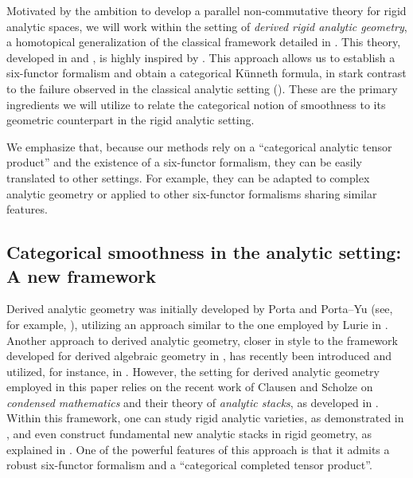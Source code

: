 \documentclass[oneside, hidelinks, 12pt, a4paper,reqno]{amsart}
\theoremstyle{plain}
\theoremstyle{definition}
\theoremstyle{plain}
\begin{document}
Motivated by the ambition to develop a parallel non-commutative theory for rigid analytic spaces, we will work within the setting of \emph{derived rigid analytic geometry}, a homotopical generalization of the classical framework detailed in \cite{bosch2014lectures}. This theory, developed in  and , is highly inspired by \cite{mikami2023fppfdescentcondensedanimatedrings}. This approach allows us to establish a six-functor formalism and obtain a categorical K\"unneth formula, in stark contrast to the failure observed in the classical analytic setting (). These are the primary ingredients we will utilize to relate the categorical notion of smoothness to its geometric counterpart in the rigid analytic setting.

We emphasize that, because our methods rely on a ``categorical analytic tensor product'' and the existence of a six-functor formalism, they can be easily translated to other settings. For example, they can be adapted to complex analytic geometry or applied to other six-functor formalisms sharing similar features.

\subsection{Categorical smoothness in the analytic setting: A new framework}

Derived analytic geometry was initially developed by Porta and Porta--Yu (see, for example, \cite{porta2020representability,porta2018derivedcomplexanalyticgeometry, porta2018derived, porta2022non}), utilizing an approach similar to the one employed by Lurie in \cite{SAG}. Another approach to derived analytic geometry, closer in style to the framework developed for derived algebraic geometry in \cite{hag}, has recently been introduced and utilized, for instance, in \cite{benbassat2024perspectivefoundationsderivedanalytic, BAMBOZZI20181865}. However, the setting for derived analytic geometry employed in this paper relies on the recent work of Clausen and Scholze on \emph{condensed mathematics} and their theory of \emph{analytic stacks}, as developed in \cite{analytic, clausen2019lectures, Clausen_Scholze_lectures, complex}. Within this framework, one can study rigid analytic varieties, as demonstrated in \cite{mikami2023fppfdescentcondensedanimatedrings, andreychev2021pseudocoherent}, and even construct fundamental new analytic stacks in rigid geometry, as explained in \cite{camargo2024analyticrhamstackrigid}. One of the powerful features of this approach is that it admits a robust six-functor formalism and a ``categorical completed tensor product''.
\end{document}
